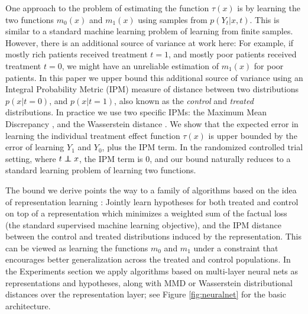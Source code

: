 One approach to the problem of estimating the function $\tau(x)$ is by learning the two functions $m_0(x)$ and $m_1(x)$ using samples from $p(Y_t|x,t)$. This is similar to a standard machine learning problem of learning from finite samples. However, there is an additional source of variance at work here: For example, if mostly rich patients received treatment $t=1$, and mostly poor patients received treatment $t=0$, we might have an unreliable estimation of $m_1(x)$ for poor patients. %
In this paper we upper bound this additional source of variance using an Integral Probability Metric (IPM) measure of distance between two distributions $p(x|t=0)$, and $p(x|t=1)$, also known as the \emph{control} and \emph{treated} distributions. %
In practice we use two specific IPMs: the Maximum Mean Discrepancy \cite{gretton2012mmd}, and the Wasserstein distance \cite{villani2008optimal,cuturi2014fast}. We show that the expected error in learning the individual treatment effect function $\tau(x)$ is upper bounded by the error of learning $Y_1$ and $Y_0$, plus the IPM term. In the randomized controlled trial setting, where $t \indep x$, the IPM term is $0$, and our bound naturally reduces to a standard learning problem of learning two functions.

The bound we derive points the way to a family of algorithms based on the idea of representation learning \cite{bengio2013representation}: Jointly learn  hypotheses for both treated and control on top of a representation which minimizes a weighted sum of the factual loss (the standard supervised machine learning objective), and the IPM distance between the control and treated distributions induced by the representation. This can be viewed as learning the functions $m_0$ and $m_1$ under a constraint that encourages better generalization across the treated and control populations.
In the Experiments section we apply algorithms based on multi-layer neural nets as representations and hypotheses, along with MMD or Wasserstein distributional distances over the representation layer; see Figure \ref{fig:neuralnet} for the basic architecture.


